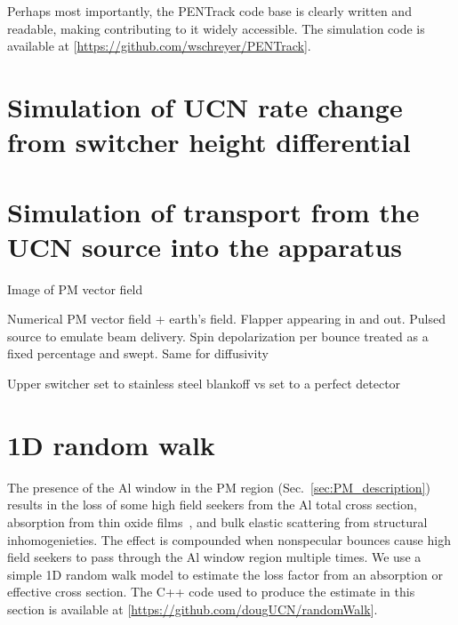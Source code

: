 Perhaps most importantly, the PENTrack code base is clearly written and readable, making contributing to it widely accessible. The simulation code is available at [\url{https://github.com/wschreyer/PENTrack}].


\section{Simulation of UCN rate change from switcher height differential}\label{sec:switcher_height_monte_carlo}





\section{Simulation of transport from the UCN source into the apparatus}\label{sec:switcher_wye_transport_monte_carlo}


Image of PM vector field

Numerical PM vector field + earth's field. Flapper appearing in and out. Pulsed source to emulate beam delivery. Spin depolarization per bounce treated as a fixed percentage and swept. Same for diffusivity

Upper switcher set to stainless steel blankoff vs set to a perfect detector



\section{1D random walk}\label{sec:1D_random_walk}


The presence of the Al window in the PM region (Sec.~\ref{sec:PM_description}) results in the loss of some high field seekers from the Al total cross section, absorption from thin oxide films~\cite{pokotilovski_effect_2016}, and bulk elastic scattering from structural inhomogenieties. The effect is compounded when nonspecular bounces cause high field seekers to pass through the Al window region multiple times. We use a simple 1D random walk model to estimate the loss factor from an absorption or effective cross section. The C++ code used to produce the estimate in this section is available at [\url{https://github.com/dougUCN/randomWalk}].


